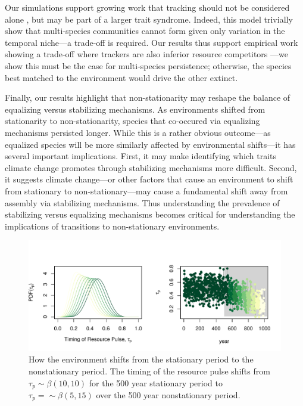 \documentclass[11pt,letterpaper]{article}
\begin{document}
Our simulations support growing work that tracking should not be considered alone \citep{Diamond:2011nx,Dorji2013,Ishioka2013,kharouba2014,du2017}, but may be part of a larger trait syndrome. Indeed, this model trivially show that multi-species communities cannot form given only variation in the temporal niche---a trade-off is required. Our results thus support empirical work showing a trade-off where trackers are also inferior resource competitors \citep{lasky2016,Zhu2016BioLetters}---we show this must be the case for multi-species persistence; otherwise, the species best matched to the environment would drive the other extinct.

Finally, our results highlight that non-stationarity may reshape the balance of equalizing versus stabilizing mechanisms. As environments shifted from stationarity to non-stationarity, species that co-occured via equalizing mechanisms persisted longer. While this is a rather obvious outcome---as equalized species will be more similarly affected by environmental shifts---it has several important implications. First, it may make identifying which traits climate change promotes through stabilizing mechanisms more difficult. Second, it suggests climate change---or other factors that cause an environment to shift from stationary to non-stationary---may cause a fundamental shift away from assembly via stabilizing mechanisms. Thus understanding the prevalence of stabilizing versus equalizing mechanisms \citep[which ecology has worked on for many decades,][]{Caswell:1976np,Chesson:2000vd} becomes critical for understanding the implications of transitions to non-stationary environments. \\

\begin{figure}[h!]
\centering
\includegraphics[width=1\textwidth]{..//..//..//R/graphs/modelruns/manuscript/modelsupp.pdf}
\caption{How the environment shifts from the stationary period to the nonstationary period. The timing of the resource pulse shifts from $\tau_{p} \sim \beta(10,10)$ for the 500 year stationary period to $\tau_{p}=\sim \beta(5,15)$ over the 500 year nonstationary period.}
\label{fig:figR0}
\end{figure}
\end{document}
